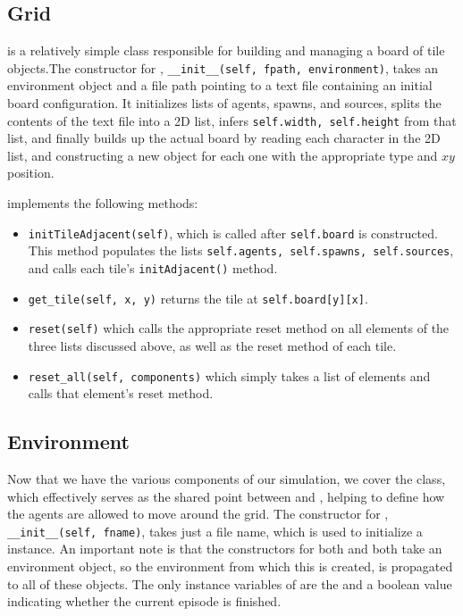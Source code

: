 \documentclass[11pt]{article}
\begin{document}
\subsection{Grid}

 is a relatively simple class responsible for building and managing a board of tile objects.The constructor for , \texttt{__init__(self, fpath, environment)}, takes an environment object and a file path pointing to a text file containing an initial board configuration. It initializes lists of agents, spawns, and sources, splits the contents of the text file into a 2D list, infers \texttt{self.width, self.height} from that list, and finally builds up the actual board by reading each character in the 2D list, and constructing a new  object for each one with the appropriate type and $xy$ position.

 implements the following methods:

\begin{itemize}
\item \texttt{initTileAdjacent(self)}, which is called after \texttt{self.board} is constructed. This method populates the lists \texttt{self.agents, self.spawns, self.sources}, and calls each tile's \texttt{initAdjacent()} method.
\item \texttt{get_tile(self, x, y)} returns the tile at \texttt{self.board[y][x]}.
\item \texttt{reset(self)} which calls the appropriate reset method on all elements of the three lists discussed above, as well as the reset method of each tile.
\item \texttt{reset_all(self, components)} which simply takes a list of elements and calls that element's reset method.
\end{itemize}

\subsection{Environment}

Now that we have the various components of our simulation, we cover the  class, which effectively serves as the shared point between  and , helping to define how the agents are allowed to move around the grid. The constructor for , \texttt{__init__(self, fname)}, takes just a file name, which is used to initialize a  instance. An important note is that the constructors for both  and  both take an environment object, so the environment from which this  is created, is propagated to all of these objects. The only instance variables of  are the  and a boolean value indicating whether the current episode is finished.
\end{document}
